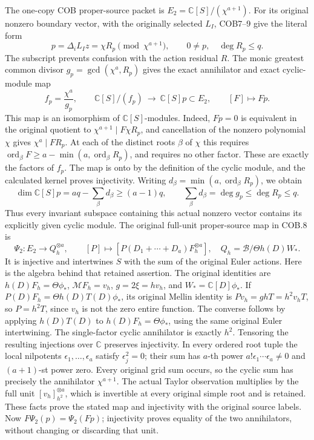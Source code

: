 The one-copy COB proper-source packet is
\(E_2=\mathbb C[S]/(\chi^{a+1})\).
For its original nonzero boundary vector, with the originally selected
\(L_I\), COB7--9 give the literal
form
\begin{equation}
 p=\Delta_iL_Iz=\chi R_p\pmod{\chi^{a+1}},
 \qquad 0\ne p,\quad \deg R_p\leq q .
 \tag{CJA20}
\end{equation}
The subscript prevents confusion with the action residual \(R\).
The monic greatest common divisor
\(g_p=\gcd(\chi^a,R_p)\) gives the exact annihilator and exact
cyclic-module map
\begin{equation}
 f_p=\frac{\chi^a}{g_p},\qquad
 \mathbb C[S]/(f_p)\ \longrightarrow\ \mathbb C[S]p\subset E_2,
 \qquad [F]\longmapsto Fp .
 \tag{CJA21}
\end{equation}
This map is an isomorphism of \(\mathbb C[S]\)-modules.
Indeed, \(Fp=0\) is equivalent in the original quotient to
\(\chi^{a+1}\mid F\chi R_p\), and cancellation of the nonzero
polynomial \(\chi\) gives \(\chi^a\mid FR_p\).
At each of the distinct roots \(\beta\) of \(\chi\) this requires
\(\operatorname{ord}_\beta F\geq
a-\min(a,\operatorname{ord}_\beta R_p)\), and requires no other
factor.  These are exactly the factors of \(f_p\).
The map is onto by the definition of the cyclic module, and the
calculated kernel proves injectivity.
Writing \(d_\beta=\min(a,\operatorname{ord}_\beta R_p)\), we obtain
\begin{equation}
 \dim\mathbb C[S]p
   =aq-\sum_\beta d_\beta\geq(a-1)q,\qquad
 \sum_\beta d_\beta=\deg g_p\leq\deg R_p\leq q .
 \tag{CJA22}
\end{equation}
Thus every invariant subspace containing this actual nonzero vector
contains its explicitly given cyclic module.
The original full-unit proper-source map in COB.8 is
\[
 \Psi_2:E_2\longrightarrow Q_h^{\otimes a},\qquad
 [P]\longmapsto
 [P(D_1+\cdots+D_a)F_h^{\otimes a}],
 \quad Q_h=\mathscr B/\Theta h(D)W_* .
 \]
It is injective and intertwines \(S\) with the sum of the original
Euler actions.  Here is the algebra behind that retained assertion.
The original identities are \(h(D)F_h=\Theta\phi_*\),
\(\mathcal MF_h=v_h\), \(g=2\xi=hv_h\), and
\(W_*=\mathbb C[D]\phi_*\).
If \(P(D)F_h=\Theta h(D)T(D)\phi_*\), its original Mellin
identity is \(Pv_h=ghT=h^2v_hT\), so
\(P=h^2T\), since \(v_h\) is not the zero entire function.
The converse follows by applying \(h(D)T(D)\) to
\(h(D)F_h=\Theta\phi_*\), using the same original Euler
intertwining.  The single-factor cyclic annihilator is exactly
\(h^2\).
Tensoring the resulting injections over \(\mathbb C\) preserves
injectivity.  In every ordered root tuple the local nilpotents
\(\epsilon_1,\ldots,\epsilon_a\) satisfy \(\epsilon_j^2=0\);
their sum has \(a\)-th power
\(a!\epsilon_1\cdots\epsilon_a\ne0\) and \((a+1)\)-st power zero.
Every original grid sum occurs, so the cyclic sum has precisely
the annihilator \(\chi^{a+1}\).
The actual Taylor observation multiplies by the full unit
\([v_h]_{h^2}^{\otimes a}\), which is invertible at every original
simple root and is retained.
These facts prove the stated map and injectivity with the original
source labels.
Now \(F\Psi_2(p)=\Psi_2(Fp)\); injectivity proves equality of the
two annihilators, without changing or discarding that unit.

